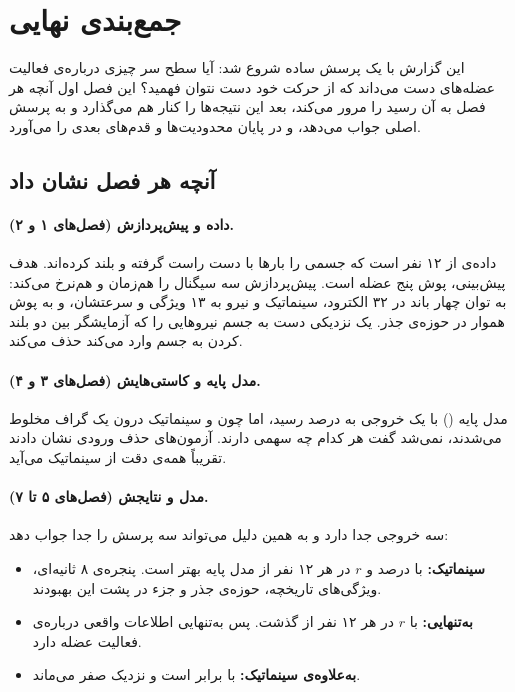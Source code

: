 \FloatBarrier
\section{جمع‌بندی نهایی}
\label{sec:conclusion}

این گزارش با یک پرسش ساده شروع شد: آیا  سطح سر چیزی درباره‌ی فعالیت عضله‌های دست می‌داند که از حرکت خود دست نتوان فهمید؟ این فصل اول آنچه هر فصل به آن رسید را مرور می‌کند، بعد این نتیجه‌ها را کنار هم می‌گذارد و به پرسش اصلی جواب می‌دهد، و در پایان محدودیت‌ها و قدم‌های بعدی را می‌آورد.

\subsection{آنچه هر فصل نشان داد}

\paragraph{داده و پیش‌پردازش (فصل‌های ۱ و ۲).} داده‌ی  از ۱۲ نفر است که جسمی را بارها با دست راست گرفته و بلند کرده‌اند. هدف پیش‌بینی، پوش  پنج عضله است. پیش‌پردازش  سه سیگنال را هم‌زمان و هم‌نرخ می‌کند:  به توان چهار باند در ۳۲ الکترود، سینماتیک و نیرو به ۱۳ ویژگی و سرعتشان، و  به پوش هموار در حوزه‌ی جذر. یک  نزدیکی دست به جسم نیروهایی را که آزمایشگر بین دو بلند کردن به جسم وارد می‌کند حذف می‌کند.

\paragraph{مدل پایه و کاستی‌هایش (فصل‌های ۳ و ۴).} مدل پایه () با یک خروجی به   درصد رسید، اما چون  و سینماتیک درون یک گراف مخلوط می‌شدند، نمی‌شد گفت هر کدام چه سهمی دارند. آزمون‌های حذف ورودی نشان دادند تقریباً همه‌ی دقت از سینماتیک می‌آید.

\paragraph{مدل  و نتایجش (فصل‌های ۵ تا ۷).}  سه خروجی جدا دارد و به همین دلیل می‌تواند سه پرسش را جدا جواب دهد:
\begin{itemize}
\item \textbf{سینماتیک:}  با   درصد و $r$  در هر ۱۲ نفر از مدل پایه بهتر است. پنجره‌ی ۸ ثانیه‌ای، ویژگی‌های تاریخچه، حوزه‌ی جذر و جزء  در  پشت این بهبودند.
\item \textbf{ به‌تنهایی:}  با $r$  در هر ۱۲ نفر از  گذشت. پس  به‌تنهایی اطلاعات واقعی درباره‌ی فعالیت عضله دارد.
\item \textbf{ به‌علاوه‌ی سینماتیک:}  با  برابر است و  نزدیک صفر می‌ماند.
\end{itemize}

